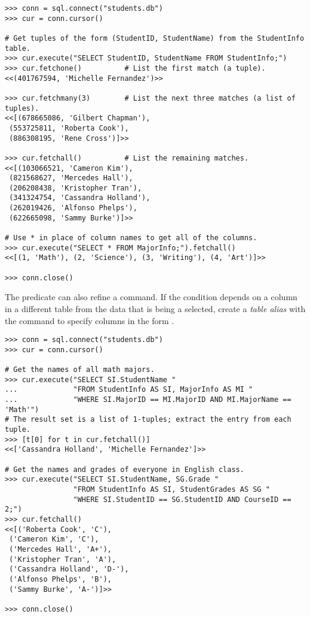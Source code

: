 \begin{lstlisting}
>>> conn = sql.connect("students.db")
>>> cur = conn.cursor()

# Get tuples of the form (StudentID, StudentName) from the StudentInfo table.
>>> cur.execute("SELECT StudentID, StudentName FROM StudentInfo;")
>>> cur.fetchone()          # List the first match (a tuple).
<<(401767594, 'Michelle Fernandez')>>

>>> cur.fetchmany(3)        # List the next three matches (a list of tuples).
<<[(678665086, 'Gilbert Chapman'),
 (553725811, 'Roberta Cook'),
 (886308195, 'Rene Cross')]>>

>>> cur.fetchall()          # List the remaining matches.
<<[(103066521, 'Cameron Kim'),
 (821568627, 'Mercedes Hall'),
 (206208438, 'Kristopher Tran'),
 (341324754, 'Cassandra Holland'),
 (262019426, 'Alfonso Phelps'),
 (622665098, 'Sammy Burke')]>>

# Use * in place of column names to get all of the columns.
>>> cur.execute("SELECT * FROM MajorInfo;").fetchall()
<<[(1, 'Math'), (2, 'Science'), (3, 'Writing'), (4, 'Art')]>>

>>> conn.close()
\end{lstlisting}

The  predicate can also refine a  command.
If the condition depends on a column in a different table from the data that is being a selected, create a \emph{table alias} with the  command to specify columns in the form .

\begin{lstlisting}
>>> conn = sql.connect("students.db")
>>> cur = conn.cursor()

# Get the names of all math majors.
>>> cur.execute("SELECT SI.StudentName "
...             "FROM StudentInfo AS SI, MajorInfo AS MI "
...             "WHERE SI.MajorID == MI.MajorID AND MI.MajorName == 'Math'")
# The result set is a list of 1-tuples; extract the entry from each tuple.
>>> [t[0] for t in cur.fetchall()]
<<['Cassandra Holland', 'Michelle Fernandez']>>

# Get the names and grades of everyone in English class.
>>> cur.execute("SELECT SI.StudentName, SG.Grade "
                "FROM StudentInfo AS SI, StudentGrades AS SG "
                "WHERE SI.StudentID == SG.StudentID AND CourseID == 2;")
>>> cur.fetchall()
<<[('Roberta Cook', 'C'),
 ('Cameron Kim', 'C'),
 ('Mercedes Hall', 'A+'),
 ('Kristopher Tran', 'A'),
 ('Cassandra Holland', 'D-'),
 ('Alfonso Phelps', 'B'),
 ('Sammy Burke', 'A-')]>>

>>> conn.close()
\end{lstlisting}

